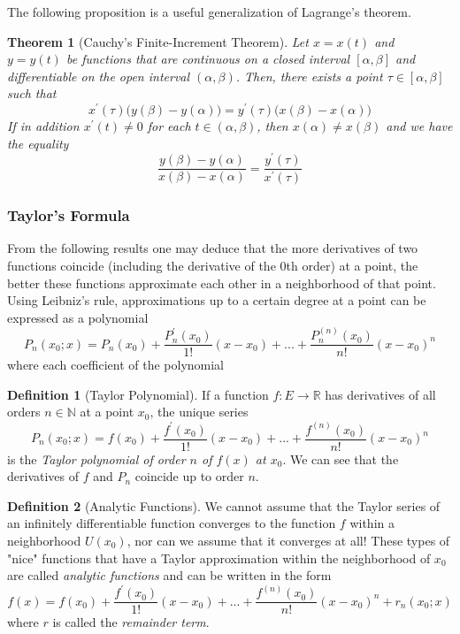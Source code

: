 \documentclass{article}
\newtheorem{theorem}{Theorem}[section]
\theoremstyle{remark}
\theoremstyle{definition}
\newtheorem{definition}{Definition}[section]
\begin{document}
The following proposition is a useful generalization of Lagrange's theorem. 
\begin{theorem}[Cauchy's Finite-Increment Theorem]
Let $x = x(t)$ and $y = y(t)$ be functions that are continuous on a closed interval $[\alpha, \beta]$ and differentiable on the open interval $(\alpha, \beta)$. Then, there exists a point $\tau \in [\alpha, \beta]$ such that
\[x^\prime (\tau) \big( y(\beta) - y (\alpha)\big) = y^\prime (\tau) \big( x(\beta) - x(\alpha)\big)\]
If in addition $x^\prime (t) \neq 0$ for each $t \in (\alpha, \beta)$, then $x(\alpha) \neq x(\beta)$ and we have the equality 
\[\frac{y(\beta) - y(\alpha)}{x(\beta) - x(\alpha)} = \frac{y^\prime (\tau)}{x^\prime (\tau)}\]
\end{theorem}

\subsubsection{Taylor's Formula}
From the following results one may deduce that the more derivatives of two functions coincide (including the derivative of the $0$th order) at a point, the better these functions approximate each other in a neighborhood of that point. Using Leibniz's rule, approximations up to a certain degree at a point can be expressed as a polynomial 
\[P_n (x_0; x) = P_n (x_0) + \frac{P_n^\prime (x_0)}{1!} (x-x_0) + ... + \frac{P_n^{(n)} (x_0)}{n!} (x-x_0)^n\]
where each coefficient of the polynomial 

\begin{definition}[Taylor Polynomial]
If a function $f:E \longrightarrow \mathbb{R}$ has derivatives of all orders $n \in \mathbb{N}$ at a point $x_0$, the unique series
\[P_n (x_0; x) = f(x_0) + \frac{f^\prime (x_0)}{1!} (x-x_0) + ... + \frac{f^{(n)} (x_0)}{n!} (x-x_0)^n\]
is the \textit{Taylor polynomial of order $n$ of $f(x)$ at $x_0$}. We can see that the derivatives of $f$ and $P_n$ coincide up to order $n$. 
\end{definition}

\begin{definition}[Analytic Functions]
We cannot assume that the Taylor series of an infinitely differentiable function converges to the function $f$ within a neighborhood $U(x_0)$, nor can we assume that it converges at all! These types of "nice" functions that have a Taylor approximation within the neighborhood of $x_0$ are called \textit{analytic functions} and can be written in the form 
\[f(x) =  f(x_0) + \frac{f^\prime (x_0)}{1!} (x-x_0) + ... + \frac{f^{(n)} (x_0)}{n!} (x-x_0)^n + r_n (x_0; x)\]
where $r$ is called the \textit{remainder term}. 
\end{definition}
\end{document}
